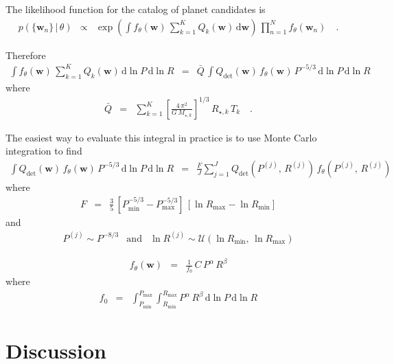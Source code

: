 \documentclass[12pt,preprint]{aastex}
\newcommand{\sectlabel}[1]{\label{sect:#1}}
\newcommand{\dd}{\ensuremath{\,\mathrm{d}}}
\newcommand{\bvec}[1]{{\ensuremath{\boldsymbol{#1}}}}
\newcommand{\params}{{\ensuremath{\bvec{w}}}}
\newcommand{\poppars}{{\ensuremath{\theta}}}
\begin{document}
The likelihood function for the catalog of planet candidates is
\begin{eqnarray}
p(\{\params_n\}\,|\,\poppars) &\propto&
    \exp \left(
        \int f_\poppars (\params)\,\sum_{k=1}^K Q_k(\params) \dd\params
    \right) \, \prod_{n=1}^N f_\poppars (\params_n) \quad.
\end{eqnarray}

Therefore
\begin{eqnarray}
\int f_\poppars (\params)\,\sum_{k=1}^K Q_k(\params) \dd\ln P\dd\ln R &=&
    \bar{Q}\,\int Q_{\mathrm{det}}(\params)\,f_\poppars(\params)\,P^{-5/3}
        \dd\ln P\dd\ln R
\end{eqnarray}
where
\begin{eqnarray}
\bar{Q} &=& \sum_{k=1}^K
    \left[\frac{4\,\pi^2}{G\,M_{\star,k}}\right]^{1/3}\,R_{\star,k}\,T_k
\quad.
\end{eqnarray}

The easiest way to evaluate this integral in practice is to use Monte Carlo
integration to find
\begin{eqnarray}
\int Q_{\mathrm{det}}(\params)\,f_\poppars(\params)\,P^{-5/3}\dd\ln P\dd\ln R
&=& \frac{F}{J}\sum_{j=1}^J Q_{\mathrm{det}}(P^{(j)},\,R^{(j)})\,
        f_\poppars(P^{(j)},\,R^{(j)})
\end{eqnarray}
where
\begin{eqnarray}
F &=& \frac{3}{5}\,[P_\mathrm{min}^{-5/3}-P_\mathrm{max}^{-5/3}]\,
      [\ln R_\mathrm{max} - \ln R_\mathrm{min}]
\end{eqnarray}
and
\begin{eqnarray}
P^{(j)} \sim P^{-8/3} &\mathrm{and}&
\ln R^{(j)} \sim \mathcal{U}(\ln R_\mathrm{min},\,\ln R_\mathrm{max})
\end{eqnarray}


\begin{eqnarray}
f_\poppars (\params) &=& \frac{1}{f_0}\,C\,P^\alpha\,R^\beta
\end{eqnarray}
where
\begin{eqnarray}
f_0 &=&
    \int_{P_\mathrm{min}}^{P_\mathrm{max}}
    \int_{R_\mathrm{min}}^{R_\mathrm{max}}
    P^\alpha\,R^\beta\dd\ln P\dd\ln R
\end{eqnarray}



\section{Discussion}\sectlabel{discussion}
\end{document}
